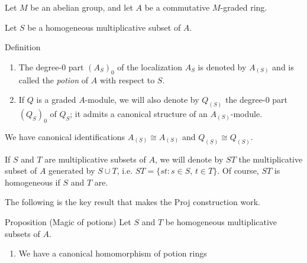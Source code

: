 \documentclass[9pt]{beamer}
\begin{document}
\begin{frame}


Let $M$ be an abelian group, and let $A$ be a commutative $M$-graded ring.

Let $S$ be a homogeneous multiplicative subset of $A$. \begin{block}{Definition}
\begin{enumerate}
\item
The degree-$0$ part $(A_S)_0$ of the localization $A_{S}$ is denoted by $A_{(S)}$ and is called the \emph{potion} of $A$ with respect to $S$. 
\item
If $Q$ is a graded $A$-module, we will also denote by $Q_{(S)}$ the degree-$0$ part $(Q_S)_0$ of $Q_S$; it admits a canonical structure of an $A_{(S)}$-module.
\end{enumerate}
\end{block}


We have canonical identifications
$A_{(\underline{S})} \cong A_{(S)}$ and $Q_{(\underline{S})} \cong Q_{(S)}$.


If $S$ and $T$ are multiplicative subsets of $A$, we will denote by $ST$ the multiplicative subset of $A$ generated by $S \cup T$, i.e. $ST = \{st : s \in S, \, t \in T \}$. Of course, $ST$ is homogeneous if $S$ and $T$ are.\end{frame}\begin{frame}
The following is the key result that makes the Proj construction work.

\begin{block}{Proposition (Magic of potions)}
\label{prop:magical} 
Let $S$ and $T$ be homogeneous multiplicative subsets of $A$. 
\begin{enumerate}
\item 
\label{it:magic-1}
We have a canonical homomorphism of potion rings 


\end{enumerate}
\end{block}
\end{frame}
\end{document}
